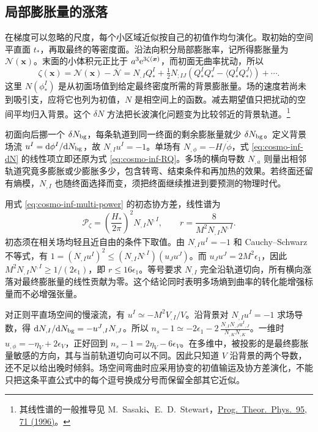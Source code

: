 \subsection{局部膨胀量的涨落}\label{sec:cosmo-inf-dN}

在梯度可以忽略的尺度，每个小区域近似按自己的初值作均匀演化。取初始的空间平直面 $t_*$，再取最终的等密度面。沿法向积分局部膨胀率，记所得膨胀量为 $\mathcal N(\bm x)$。末面的小体积元正比于 $a^3\mathrm{e}^{3\zeta(\bm x)}$，而初面无曲率扰动，所以
\begin{equation}\label{eq:cosmo-inf-dN}
 \zeta(\bm x)=\mathcal N(\bm x)-\overline{\mathcal N}
 =N_{,I}Q_*^I+\tfrac12N_{;IJ}
   (Q_*^I Q_*^J-\langle Q_*^I Q_*^J\rangle)+\cdots .
\end{equation}
这里 $N(\phi_*^I)$ 是从初面场值到给定最终密度所需的背景膨胀量。场的速度若尚未到吸引支，应将它也列为初值，$N$ 是相空间上的函数。减去期望值只把扰动的空间平均归入背景。这个 $\delta N$ 方法把长波演化问题变为比较邻近的背景轨道。\footnote{其线性谱的一般推导见 M.~Sasaki、E.~D.~Stewart，\href{https://arxiv.org/abs/astro-ph/9507001}{Prog.\ Theor.\ Phys.\ 95, 71 (1996)}。}

初面向后挪一个 $\delta N_{\rm bg}$，每条轨道到同一终面的剩余膨胀量就少 $\delta N_{\rm bg}$。定义背景场流 $u^I=\dd\phi^I/\dd N_{\rm bg}$，故 $N_{,I}u^I=-1$。单场有 $N_{,\phi}=-H/\dot\phi$，式 \eqref{eq:cosmo-inf-dN} 的线性项立即还原为式 \eqref{eq:cosmo-inf-RQ}。多场的横向导数 $N_{,a}$ 则量出相邻轨道究竟多膨胀或少膨胀多少，包含转弯、结束条件和再加热的效果。若终面还留有熵模，$N_{,I}$ 也随终面选择而变，须把终面继续推进到要预测的物理时代。

用式 \eqref{eq:cosmo-inf-multi-power} 的初态协方差，线性谱为
\begin{equation}\label{eq:cosmo-inf-dNpower}
 \mathcal P_\zeta=\left(\frac{H_*}{2\pi}\right)^2N_{,I}N^{,I},
 \qquad r=\frac{8}{M^2N_{,I}N^{,I}} .
\end{equation}
初态须在相关场均轻且近自由的条件下取值。由 $N_{,I}u^I=-1$ 和 Cauchy--Schwarz 不等式，有 $1=(N_{,I}u^I)^2\leq(N_{,I}N^{,I})(u_Ju^J)$。而 $u_Ju^J=2M^2\epsilon_1$，因此 $M^2N_{,I}N^{,I}\geq1/(2\epsilon_1)$，即 $r\leq16\epsilon_1$。等号要求 $N_{,I}$ 完全沿轨道切向，所有横向涨落对最终膨胀量的线性贡献为零。这个结论同时表明多场熵到曲率的转化能增强标量而不必增强张量。

对正则平直场空间的慢滚流，有 $u^I\simeq-M^2V_{,I}/V$。沿背景对 $N_{,I}u^I=-1$ 求场导数，得 $\dd N_{,I}/\dd N_{\rm bg}=-u^J{}_{,I}N_{,J}$。所以 $n_s-1\simeq-2\epsilon_1 -2\,\frac{N_{,I}N_{,J}u^I{}_{,J}}{N_{,K}N_{,K}}$。一维时 $u_{,\phi}=-\eta_V+2\epsilon_V$，正好回到 $n_s-1=2\eta_V-6\epsilon_V$。在多维中，被投影的是最终膨胀量敏感的方向，其与当前轨道切向可以不同。因此只知道 $V$ 沿背景的两个导数，还不足以给出晚时倾斜。场空间弯曲时应采用协变的初值输运及协方差演化，不能只把这条平直公式中的每个逗号换成分号而保留全部其它近似。

